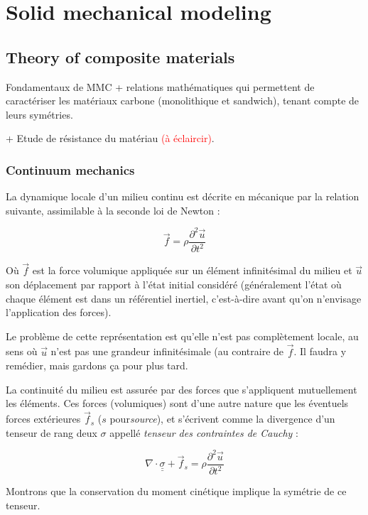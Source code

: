 \documentclass{article}
\begin{document}
\tableofcontents
\newpage

\setcounter{page}{1}

\section{Solid mechanical modeling}

\subsection{Theory of composite materials}

Fondamentaux de MMC + relations mathématiques qui permettent de caractériser les matériaux carbone (monolithique et sandwich), tenant compte de leurs symétries.

+ Etude de résistance du matériau \textcolor{red}{(à éclaircir)}.

\hrulefill

\subsubsection{Continuum mechanics}

La dynamique locale d'un milieu continu est décrite en mécanique par la relation suivante, assimilable à la seconde loi de Newton :

\[
\vec{f}=\rho\frac{\partial^2 \vec{u}}{\partial t^2}
\]

Où $\vec{f}$ est la force volumique appliquée sur un élément infinitésimal du milieu et $\vec{u}$ son déplacement par rapport à l'état initial considéré (généralement l'état où chaque élément est dans un référentiel inertiel, c'est-à-dire avant qu'on n'envisage l'application des forces).

Le problème de cette représentation est qu'elle n'est pas complètement locale, au sens où $\vec{u}$ n'est pas une grandeur infinitésimale (au contraire de $\vec{f}$. Il faudra y remédier, mais gardons ça pour plus tard.

La continuité du milieu est assurée par des forces que s'appliquent mutuellement les éléments. Ces forces (volumiques) sont d'une autre nature que les éventuels forces extérieures $\vec{f}_s$ ($s$ pour\emph{source}), et s'écrivent comme la divergence d'un tenseur de rang deux $\sigma$ appellé \emph{tenseur des contraintes de Cauchy} :

\[
\nabla\cdot\underline{\underline{\sigma}}+\vec{f}_s=\rho\frac{\partial^2 \vec{u}}{\partial t^2}
\]

Montrons que la conservation du moment cinétique implique la symétrie de ce tenseur.
\end{document}
